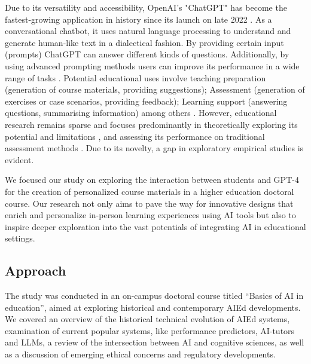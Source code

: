 \documentclass[sn-mathphys, Numbered]{sn-jnl}%
\theoremstyle{thmstyleone}%
\theoremstyle{thmstyletwo}%
\theoremstyle{thmstylethree}%
\begin{document}
Due to its versatility and accessibility, OpenAI's "ChatGPT" has become the fastest-growing application in history since its launch on late 2022 \parencite{milmo_chatgpt_2023}. As a conversational chatbot, it uses natural language processing to understand and generate human-like text in a dialectical fashion. By providing certain input (prompts) ChatGPT can answer different kinds of questions. Additionally, by using advanced prompting methods users can improve its performance in a wide range of tasks \parencite{wei_chain--thought_2023,fernando_promptbreeder_2023}. Potential educational uses involve teaching preparation (generation of course materials, providing suggestions); Assessment (generation of exercises or case scenarios, providing feedback); Learning support (answering questions, summarising information) among others \parencite{lo_what_2023,montenegro-rueda_impact_2023}.  However, educational research remains sparse and focuses predominantly in theoretically exploring its potential and limitations \parencite{qadir_engineering_2022,cain_gpteammate_2023}, and assessing its performance on traditional assessment methods \parencite{nisar_is_2023}. Due to its novelty, a gap in exploratory empirical studies is evident.

We focused our study on exploring the interaction between students and GPT-4 for the creation of personalized course materials in a higher education doctoral course. Our research not only aims to pave the way for innovative designs that enrich and personalize in-person learning experiences using AI tools but also to inspire deeper exploration into the vast potentials of integrating AI in educational settings. 




\subsection*{Approach}\label{Approach}  


The study was conducted in an on-campus doctoral course titled “Basics of AI in education”, aimed at exploring historical and contemporary AIEd developments. We covered an overview of the historical technical evolution of AIEd systems, examination of current popular systems, like performance predictors, AI-tutors and LLMs, a review of the intersection between AI and cognitive sciences, as well as a discussion of emerging ethical concerns and regulatory developments. 
\end{document}
